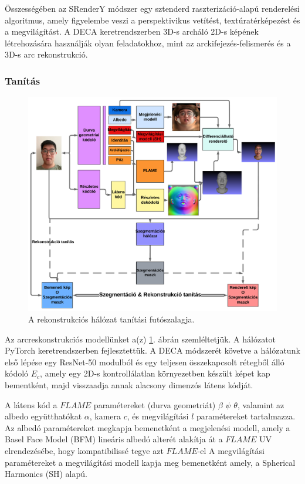 \documentclass[12pt,a4]{article}
\begin{document}
 Összességében az SRenderY módszer egy sztenderd raszterizáció-alapú renderelési algoritmus, amely figyelembe veszi a perspektivikus vetítést,
textúratérképezést és a megvilágítást. A DECA keretrendszerben 3D-s archáló 2D-s képének létrehozására használják olyan feladatokhoz, mint az arckifejezés-felismerés és a 3D-s arc rekonstrukció.

\subsubsection{Tanítás}
    \begin{figure}[h]	
		\centering
		\includegraphics[width=1\linewidth]{pipelinehun}
		\caption{  A rekonstrukciós hálózat tanítási futószalagja.}
        \label{fig:pipeline}
	\end{figure}
 
	Az arcreskonstrukciós modellünket a(z) \ref{fig:pipeline}. ábrán szemléltetjük. A hálózatot PyTorch
	keretrendszerben fejlesztettük.
	A DECA módszerét követve a hálózatunk első lépése egy
	ResNet-50 modulból és egy teljesen összekapcsolt rétegből álló kódoló
	$E_{c}$, amely egy 2D-s kontrollálatlan környezetben készült képet kap bementként, majd visszaadja annak alacsony dimenzós látens kódját.
 
 A látens kód a $FLAME$
	paramétereket (durva geometriát) $\beta$ $\psi$ $\theta$, valamint az albedo együtthatókat
	$\alpha$, kamera $c$, és megvilágítási $l$ paramétereket tartalmazza.
	Az albedó paramétereket megkapja
	bemenetként a megjelenési modell, amely a Basel Face Model (BFM)
	lineáris albedó alterét alakítja át a $FLAME$ UV elrendezésébe,
	hogy kompatibilissé tegye azt $FLAME$-el A megvilágítási paramétereket
	a megvilágítási modell kapja meg bemenetként amely,
	a Spherical Harmonics (SH) alapú.
 
\end{document}

